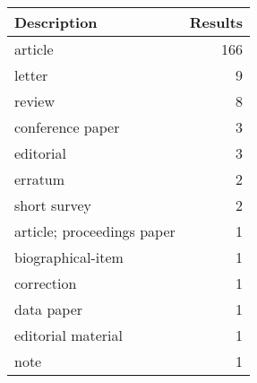 
\begin{tabular}{lr}
\toprule
Description & Results\\
\midrule
article & 166\\
letter & 9\\
review & 8\\
conference paper & 3\\
editorial & 3\\
\addlinespace
erratum & 2\\
short survey & 2\\
article; proceedings paper & 1\\
biographical-item & 1\\
correction & 1\\
\addlinespace
data paper & 1\\
editorial material & 1\\
note & 1\\
\bottomrule
\end{tabular}